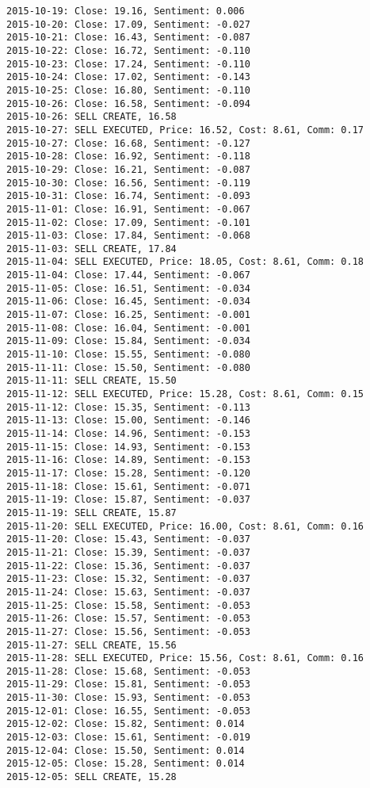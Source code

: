 \documentclass[11pt]{article}
\begin{document}
\begin{Verbatim}[commandchars=\\\{\}]
2015-10-19: Close: 19.16, Sentiment: 0.006
2015-10-20: Close: 17.09, Sentiment: -0.027
2015-10-21: Close: 16.43, Sentiment: -0.087
2015-10-22: Close: 16.72, Sentiment: -0.110
2015-10-23: Close: 17.24, Sentiment: -0.110
2015-10-24: Close: 17.02, Sentiment: -0.143
2015-10-25: Close: 16.80, Sentiment: -0.110
2015-10-26: Close: 16.58, Sentiment: -0.094
2015-10-26: SELL CREATE, 16.58
2015-10-27: SELL EXECUTED, Price: 16.52, Cost: 8.61, Comm: 0.17
2015-10-27: Close: 16.68, Sentiment: -0.127
2015-10-28: Close: 16.92, Sentiment: -0.118
2015-10-29: Close: 16.21, Sentiment: -0.087
2015-10-30: Close: 16.56, Sentiment: -0.119
2015-10-31: Close: 16.74, Sentiment: -0.093
2015-11-01: Close: 16.91, Sentiment: -0.067
2015-11-02: Close: 17.09, Sentiment: -0.101
2015-11-03: Close: 17.84, Sentiment: -0.068
2015-11-03: SELL CREATE, 17.84
2015-11-04: SELL EXECUTED, Price: 18.05, Cost: 8.61, Comm: 0.18
2015-11-04: Close: 17.44, Sentiment: -0.067
2015-11-05: Close: 16.51, Sentiment: -0.034
2015-11-06: Close: 16.45, Sentiment: -0.034
2015-11-07: Close: 16.25, Sentiment: -0.001
2015-11-08: Close: 16.04, Sentiment: -0.001
2015-11-09: Close: 15.84, Sentiment: -0.034
2015-11-10: Close: 15.55, Sentiment: -0.080
2015-11-11: Close: 15.50, Sentiment: -0.080
2015-11-11: SELL CREATE, 15.50
2015-11-12: SELL EXECUTED, Price: 15.28, Cost: 8.61, Comm: 0.15
2015-11-12: Close: 15.35, Sentiment: -0.113
2015-11-13: Close: 15.00, Sentiment: -0.146
2015-11-14: Close: 14.96, Sentiment: -0.153
2015-11-15: Close: 14.93, Sentiment: -0.153
2015-11-16: Close: 14.89, Sentiment: -0.153
2015-11-17: Close: 15.28, Sentiment: -0.120
2015-11-18: Close: 15.61, Sentiment: -0.071
2015-11-19: Close: 15.87, Sentiment: -0.037
2015-11-19: SELL CREATE, 15.87
2015-11-20: SELL EXECUTED, Price: 16.00, Cost: 8.61, Comm: 0.16
2015-11-20: Close: 15.43, Sentiment: -0.037
2015-11-21: Close: 15.39, Sentiment: -0.037
2015-11-22: Close: 15.36, Sentiment: -0.037
2015-11-23: Close: 15.32, Sentiment: -0.037
2015-11-24: Close: 15.63, Sentiment: -0.037
2015-11-25: Close: 15.58, Sentiment: -0.053
2015-11-26: Close: 15.57, Sentiment: -0.053
2015-11-27: Close: 15.56, Sentiment: -0.053
2015-11-27: SELL CREATE, 15.56
2015-11-28: SELL EXECUTED, Price: 15.56, Cost: 8.61, Comm: 0.16
2015-11-28: Close: 15.68, Sentiment: -0.053
2015-11-29: Close: 15.81, Sentiment: -0.053
2015-11-30: Close: 15.93, Sentiment: -0.053
2015-12-01: Close: 16.55, Sentiment: -0.053
2015-12-02: Close: 15.82, Sentiment: 0.014
2015-12-03: Close: 15.61, Sentiment: -0.019
2015-12-04: Close: 15.50, Sentiment: 0.014
2015-12-05: Close: 15.28, Sentiment: 0.014
2015-12-05: SELL CREATE, 15.28

\end{Verbatim}
\end{document}
